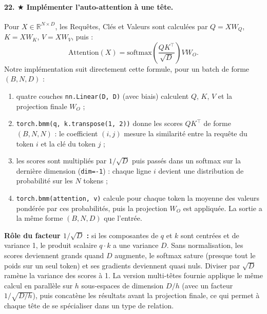 \documentclass{report}
\begin{document}
\paragraph{22. $\bigstar$ Implémenter l'auto-attention à une tête.}
Pour $X \in \mathbb{R}^{N \times D}$, les Requêtes, Clés et Valeurs sont calculées par $Q = X W_Q$, $K = X W_K$, $V = X W_V$, puis :
\begin{equation}
    \text{Attention}(X) = \text{softmax}\left(\frac{Q K^\top}{\sqrt{D}}\right) V W_O.
\end{equation}
Notre implémentation suit directement cette formule, pour un batch de forme $(B, N, D)$ :
\begin{enumerate}
    \item quatre couches \texttt{nn.Linear(D, D)} (avec biais) calculent $Q$, $K$, $V$ et la projection finale $W_O$ ;
    \item \texttt{torch.bmm(q, k.transpose(1, 2))} donne les scores $QK^\top$ de forme $(B, N, N)$ : le coefficient $(i, j)$ mesure la similarité entre la requête du token $i$ et la clé du token $j$ ;
    \item les scores sont multipliés par $1/\sqrt{D}$ puis passés dans un softmax sur la dernière dimension (\texttt{dim=-1}) : chaque ligne $i$ devient une distribution de probabilité sur les $N$ tokens ;
    \item \texttt{torch.bmm(attention, v)} calcule pour chaque token la moyenne des valeurs pondérée par ces probabilités, puis la projection $W_O$ est appliquée. La sortie a la même forme $(B, N, D)$ que l'entrée.
\end{enumerate}
\textbf{Rôle du facteur $1/\sqrt{D}$ :} si les composantes de $q$ et $k$ sont centrées et de variance 1, le produit scalaire $q \cdot k$ a une variance $D$. Sans normalisation, les scores deviennent grands quand $D$ augmente, le softmax sature (presque tout le poids sur un seul token) et ses gradients deviennent quasi nuls. Diviser par $\sqrt{D}$ ramène la variance des scores à 1. La version multi-têtes fournie applique le même calcul en parallèle sur $h$ sous-espaces de dimension $D/h$ (avec un facteur $1/\sqrt{D/h}$), puis concatène les résultats avant la projection finale, ce qui permet à chaque tête de se spécialiser dans un type de relation.
\end{document}
